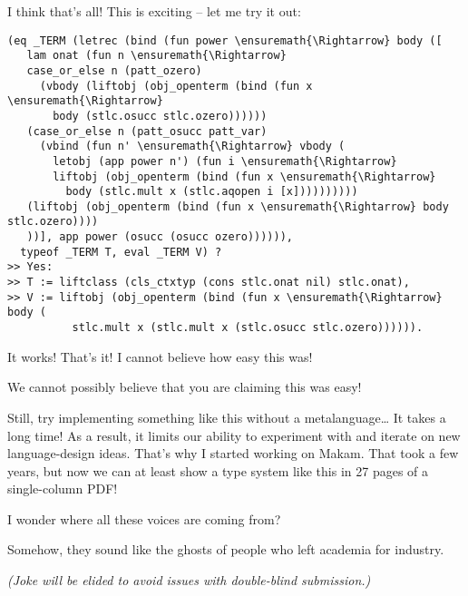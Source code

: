 \heroSTUDENT{} I think that's all! This is exciting -- let me try it out:

\begin{verbatim}
(eq _TERM (letrec (bind (fun power \ensuremath{\Rightarrow} body ([
   lam onat (fun n \ensuremath{\Rightarrow}
   case_or_else n (patt_ozero)
     (vbody (liftobj (obj_openterm (bind (fun x \ensuremath{\Rightarrow}
       body (stlc.osucc stlc.ozero))))))
   (case_or_else n (patt_osucc patt_var)
     (vbind (fun n' \ensuremath{\Rightarrow} vbody (
       letobj (app power n') (fun i \ensuremath{\Rightarrow}
       liftobj (obj_openterm (bind (fun x \ensuremath{\Rightarrow}
         body (stlc.mult x (stlc.aqopen i [x])))))))))
   (liftobj (obj_openterm (bind (fun x \ensuremath{\Rightarrow} body stlc.ozero))))
   ))], app power (osucc (osucc ozero)))))),
  typeof _TERM T, eval _TERM V) ?
>> Yes:
>> T := liftclass (cls_ctxtyp (cons stlc.onat nil) stlc.onat),
>> V := liftobj (obj_openterm (bind (fun x \ensuremath{\Rightarrow} body (
          stlc.mult x (stlc.mult x (stlc.osucc stlc.ozero)))))).
\end{verbatim}

\noindent
It works! That's it! I cannot believe how easy this was!

\heroAUDIENCE{} We cannot possibly believe that you are claiming this was
easy!

\heroAUTHOR{} Still, try implementing something like this without a
metalanguage\ldots{} It takes a long time! As a result, it limits our
ability to experiment with and iterate on new language-design ideas.
That's why I started working on Makam. That took a few years, but now we
can at least show a type system like this in 27 pages of a single-column
PDF!

\heroADVISOR{} I wonder where all these voices are coming from?

\heroSTUDENT{} Somehow, they sound like the ghosts of people who left academia
for industry.

\heroTODO{}
\textit{(Joke will be elided to avoid issues with double-blind submission.)}
